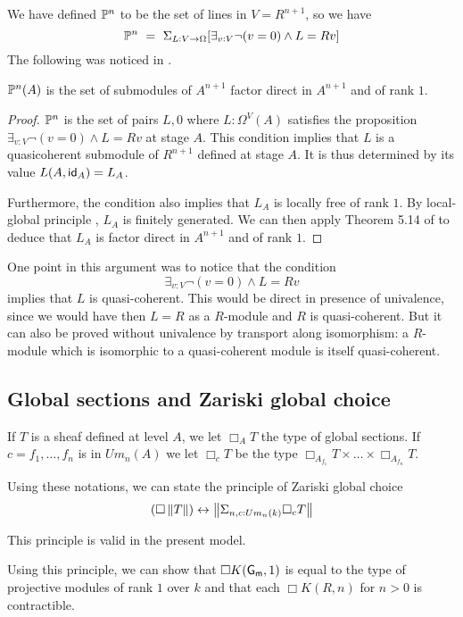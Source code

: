 We have defined $\mathbb{P}^n$ to be the set of lines in $V = R^{n+1}$, so we have
$$
\mathbb{P}^n ~=~ \Sigma_{L:V\rightarrow \Omega}[\exists_{v:V}\neg (v = 0)\wedge L = R v]
$$
The following was noticed in \cite{kockreyes}.

\begin{proposition}
  $\mathbb{P}^n(A)$ is the set of submodules of $A^{n+1}$ factor direct in $A^{n+1}$ and of rank $1$.
\end{proposition}

\begin{proof}
  $\mathbb{P}^n$ is the set of pairs $L,0$ where $L:\Omega^V(A)$ satisfies the proposition $\exists_{v:V}\neg (v = 0)\wedge L = Rv$ at stage
  $A$. This condition implies that $L$ is a quasicoherent submodule of $R^{n+1}$ defined at stage $A$.
  It is thus determined by its value $L(A,\mathsf{id}_A) = L_A$.

  Furthermore, the condition also implies that $L_A$ is locally free of rank $1$. By local-global principle \cite{lombardi-quitte},
  $L_A$ is finitely generated. We can then apply Theorem 5.14 of
  \cite{lombardi-quitte} to deduce that $L_A$ is factor direct in $A^{n+1}$ and of rank $1$.
\end{proof}

One point in this argument was to notice that the condition
$$
\exists_{v:V}\neg (v = 0)\wedge L = R v
$$
implies that $L$ is quasi-coherent. This would be direct in presence of univalence, since we would have then $L = R$ as a $R$-module
and $R$ is quasi-coherent. But it can also be proved without univalence by transport along isomorphism: a $R$-module which is
isomorphic to a quasi-coherent module is itself quasi-coherent.


\subsection{Global sections and Zariski global choice}

If $T$ is a sheaf defined at level $A$, we let $\Box_A T$ the type of global sections.
If $c = f_1,\dots,f_n$ is in $Um_n(A)$ we let $\Box_c T$ be the type $\Box_{A_{f_1}}T\times\dots\times\Box_{A_{f_n}}T$.

Using these notations, we can state the principle of Zariski global choice
$$
(\Box \left\lVert T \right\rVert)\leftrightarrow \left\lVert \Sigma_{n,c:Um_n(k)}\Box_c T \right\rVert
$$

This principle is valid in the present model.

Using this principle, we can show that $\Box K(\mathsf{G_m},1)$ is equal to the type of projective modules of rank $1$ over $k$
and that each $\Box K(R,n)$ for $n>0$ is contractible.
                                                                                  

 
